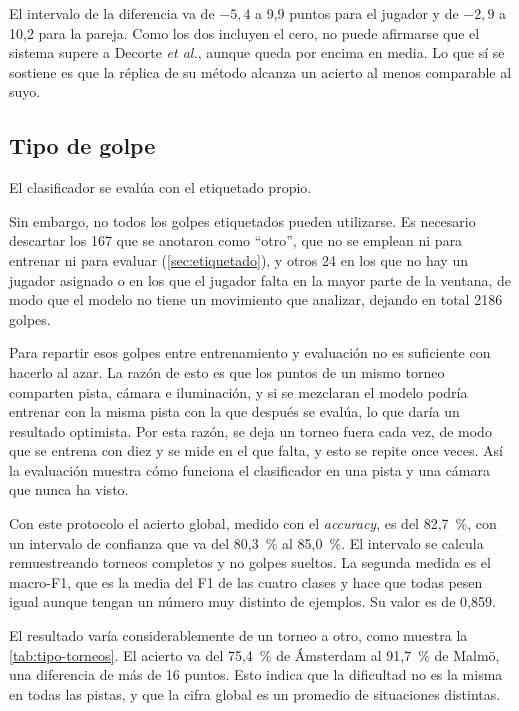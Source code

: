 El intervalo de la diferencia va de $-5{,}4$ a 9,9 puntos para el jugador y de $-2{,}9$ a 10,2 para la pareja.
Como los dos incluyen el cero, no puede afirmarse que el sistema supere a Decorte \textit{et al.}, aunque queda por encima en media.
Lo que sí se sostiene es que la réplica de su método alcanza un acierto al menos comparable al suyo.

\subsection{Tipo de golpe}
\label{sec:resultados-tipo}

El clasificador se evalúa con el etiquetado propio.

Sin embargo, no todos los golpes etiquetados pueden utilizarse.
Es necesario descartar los 167 que se anotaron como ``otro'', que no se emplean ni para entrenar ni para evaluar (\cref{sec:etiquetado}), y otros 24 en los que no hay un jugador asignado o en los que el jugador falta en la mayor parte de la ventana, de modo que el modelo no tiene un movimiento que analizar, dejando en total 2186 golpes.

Para repartir esos golpes entre entrenamiento y evaluación no es suficiente con hacerlo al azar.
La razón de esto es que los puntos de un mismo torneo comparten pista, cámara e iluminación, y si se mezclaran el modelo podría entrenar con la misma pista con la que después se evalúa, lo que daría un resultado optimista.
Por esta razón, se deja un torneo fuera cada vez, de modo que se entrena con diez y se mide en el que falta, y esto se repite once veces.
Así la evaluación muestra cómo funciona el clasificador en una pista y una cámara que nunca ha visto.

Con este protocolo el acierto global, medido con el \textit{accuracy}, es del 82,7~\%, con un intervalo de confianza que va del 80,3~\% al 85,0~\%.
El intervalo se calcula remuestreando torneos completos y no golpes sueltos.
La segunda medida es el macro-F1, que es la media del F1 de las cuatro clases y hace que todas pesen igual aunque tengan un número muy distinto de ejemplos.
Su valor es de 0,859.

El resultado varía considerablemente de un torneo a otro, como muestra la \cref{tab:tipo-torneos}.
El acierto va del 75,4~\% de Ámsterdam al 91,7~\% de Malmö, una diferencia de más de 16 puntos.
Esto indica que la dificultad no es la misma en todas las pistas, y que la cifra global es un promedio de situaciones distintas.


